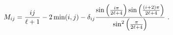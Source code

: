 \begin{equation}
M_{ij}=\frac{ij}{\ell +1}-2\min (i,j)-\delta _{ij}\frac{\sin \left( \frac{%
i\pi }{2\ell +4}\right) \sin \left( \frac{(i+2)\pi }{2\ell +4}\right) }{\sin
^{2}\left( \frac{\pi }{2\ell +4}\right) }~.  \label{Ml}
\end{equation}

